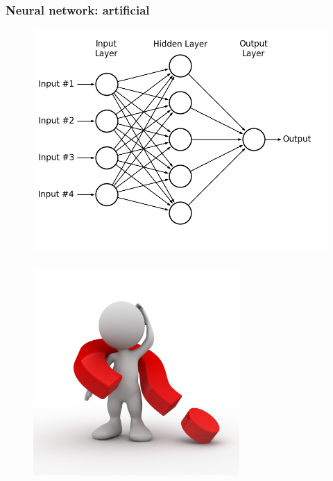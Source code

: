 \documentclass{beamer}
\begin{document}
\begin{frame}
\frametitle{Neural network: artificial}
\begin{figure}[!h]
  \centering
  \includegraphics[width=\textwidth]{fig_neural_network_1.png}
\end{figure}
\end{frame}

\begin{frame}
\frametitle{}
\begin{figure}[!h]
  \centering
  \includegraphics[width=0.7\textwidth]{ask-the-right-questions.jpg}
\end{figure}

\end{frame}
\end{document}
